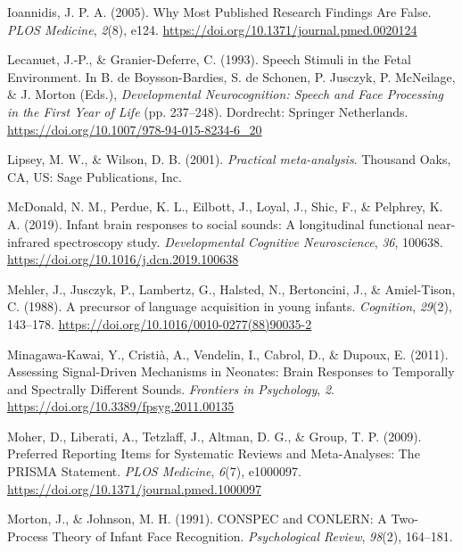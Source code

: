 \documentclass[
  man,mask,floatsintext]{apa6}
\newlength{\cslhangindent}
\newlength{\cslentryspacingunit} %
\newenvironment{CSLReferences}[2] %
 {%
  \setlength{\parindent}{0pt}
  \ifodd #1
  \let\oldpar\par
  \def\par{\hangindent=\cslhangindent\oldpar}
  \fi
  \setlength{\parskip}{#2\cslentryspacingunit}
 }%
 {}
\begin{document}
\begin{CSLReferences}{1}{0}
\leavevmode{}%
Ioannidis, J. P. A. (2005). Why {Most} {Published} {Research} {Findings} {Are} {False}. \emph{PLOS Medicine}, \emph{2}(8), e124. \url{https://doi.org/10.1371/journal.pmed.0020124}

\leavevmode{}%
Lecanuet, J.-P., \& Granier-Deferre, C. (1993). Speech {Stimuli} in the {Fetal} {Environment}. In B. de Boysson-Bardies, S. de Schonen, P. Jusczyk, P. McNeilage, \& J. Morton (Eds.), \emph{Developmental {Neurocognition}: {Speech} and {Face} {Processing} in the {First} {Year} of {Life}} (pp. 237--248). Dordrecht: Springer Netherlands. \url{https://doi.org/10.1007/978-94-015-8234-6_20}

\leavevmode{}%
Lipsey, M. W., \& Wilson, D. B. (2001). \emph{Practical meta-analysis}. Thousand Oaks, CA, US: Sage Publications, Inc.

\leavevmode{}%
McDonald, N. M., Perdue, K. L., Eilbott, J., Loyal, J., Shic, F., \& Pelphrey, K. A. (2019). Infant brain responses to social sounds: {A} longitudinal functional near-infrared spectroscopy study. \emph{Developmental Cognitive Neuroscience}, \emph{36}, 100638. \url{https://doi.org/10.1016/j.dcn.2019.100638}

\leavevmode{}%
Mehler, J., Jusczyk, P., Lambertz, G., Halsted, N., Bertoncini, J., \& Amiel-Tison, C. (1988). A precursor of language acquisition in young infants. \emph{Cognition}, \emph{29}(2), 143--178. \url{https://doi.org/10.1016/0010-0277(88)90035-2}

\leavevmode{}%
Minagawa-Kawai, Y., Cristià, A., Vendelin, I., Cabrol, D., \& Dupoux, E. (2011). Assessing {Signal}-{Driven} {Mechanisms} in {Neonates}: {Brain} {Responses} to {Temporally} and {Spectrally} {Different} {Sounds}. \emph{Frontiers in Psychology}, \emph{2}. \url{https://doi.org/10.3389/fpsyg.2011.00135}

\leavevmode{}%
Moher, D., Liberati, A., Tetzlaff, J., Altman, D. G., \& Group, T. P. (2009). Preferred {Reporting} {Items} for {Systematic} {Reviews} and {Meta}-{Analyses}: {The} {PRISMA} {Statement}. \emph{PLOS Medicine}, \emph{6}(7), e1000097. \url{https://doi.org/10.1371/journal.pmed.1000097}

\leavevmode{}%
Morton, J., \& Johnson, M. H. (1991). {CONSPEC} and {CONLERN}: {A} {Two}-{Process} {Theory} of {Infant} {Face} {Recognition}. \emph{Psychological Review}, \emph{98}(2), 164--181.


\end{CSLReferences}
\end{document}
